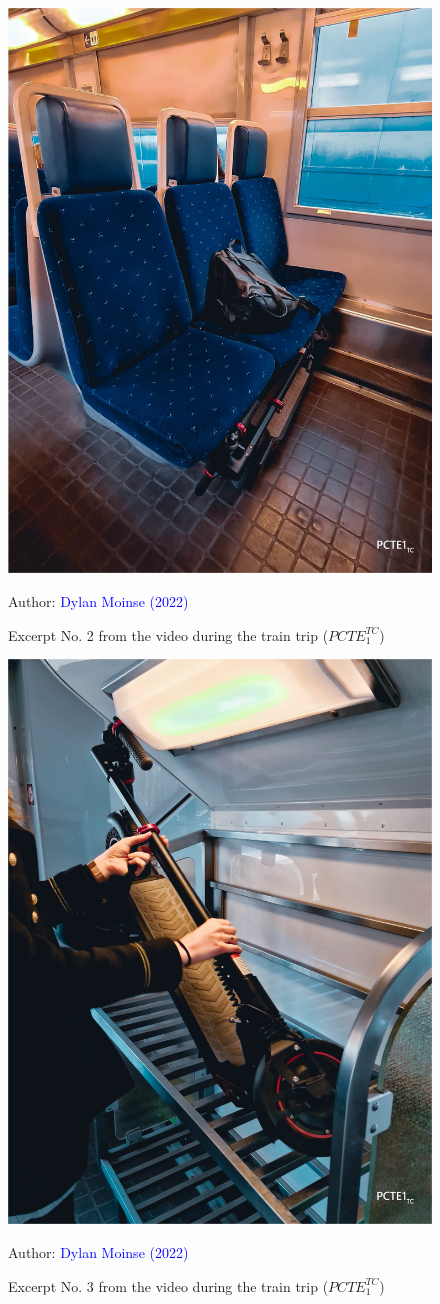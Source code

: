     \begin{figure}[h!]\vspace*{4pt}
        \caption*{Excerpt No. 2 from the video during the train trip (\(PCTE^{TC}_{1}\))}
        \centerline{\includegraphics[width=0.5\columnwidth]{src/Figures/Annexes/Extrait_Video_PCTE1_TC_2.jpg}}
        \vspace{5pt}
        \begin{flushright}\scriptsize{
        Author: \textcolor{blue}{Dylan Moinse (2022)}
        }\end{flushright}
    \end{figure}

    \begin{figure}[h!]\vspace*{4pt}
        \caption*{Excerpt No. 3 from the video during the train trip (\(PCTE^{TC}_{1}\))}
        \centerline{\includegraphics[width=0.5\columnwidth]{src/Figures/Annexes/Extrait_Video_PCTE1_TC_3.jpg}}
        \vspace{5pt}
        \begin{flushright}\scriptsize{
        Author: \textcolor{blue}{Dylan Moinse (2022)}
        }\end{flushright}
    \end{figure}

